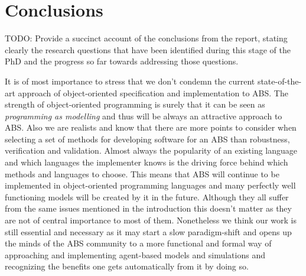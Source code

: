 \chapter{Conclusions}
\label{chap:concl}

TODO: Provide a succinct account of the conclusions from the report, stating clearly the research questions that have been identified during this stage of the PhD and the progress so far towards addressing those questions.

It is of most importance to stress that we don't condemn the current state-of-the-art approach of object-oriented specification and implementation to ABS. The strength of object-oriented programming is surely that it can be seen as \textit{programming as modelling} and thus will be always an attractive approach to ABS. Also we are realists and know that there are more points to consider when selecting a set of methods for developing software for an ABS than robustness, verification and validation. Almost always the popularity of an existing language and which languages the implementer knows is the driving force behind which methods and languages to choose. This means that ABS will continue to be implemented in object-oriented programming languages and many perfectly well functioning models will be created by it in the future. Although they all suffer from the same issues mentioned in the introduction this doesn't matter as they are not of central importance to most of them.
Nonetheless we think our work is still essential and necessary as it may start a slow paradigm-shift and opens up the minds of the ABS community to a more functional and formal way of approaching and implementing agent-based models and simulations and recognizing the benefits one gets automatically from it by doing so.